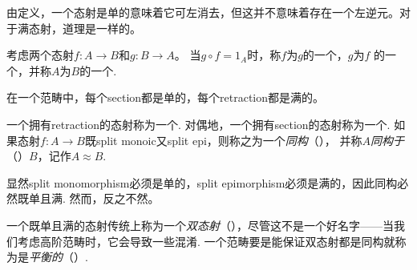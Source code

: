   由定义，一个态射是单的意味着它可左消去，但这并不意味着存在一个左逆元。对于满态射，道理是一样的。
  \begin{defn}
    考虑两个态射$f\colon A \to B$和$g\colon B \to A$。 当$g \circ f = 1_A$时，称$f$为$g$的一个，$g$为$f$ 的一个，并称$A$为$B$的一个.
  \end{defn}
  \begin{prop}
    在一个范畴中，每个section都是单的，每个retraction都是满的。
  \end{prop}
  \begin{defn}
    一个拥有retraction的态射称为一个.
    对偶地，一个拥有section的态射称为一个.
    如果态射$f\colon A\to B$既split monoic又split epi，则称之为一个\emph{同构}（），
    并称$A$\emph{同构于}（）$B$，记作$A\approx B$.  
  \end{defn}
  \begin{rem}
    显然split monomorphism必须是单的，split epimorphism必须是满的，因此同构必然既单且满. 然而，反之不然。

    一个既单且满的态射传统上称为一个\emph{双态射}（），尽管这不是一个好名字——当我们考虑高阶范畴时，它会导致一些混淆. 一个范畴要是能保证双态射都是同构就称为是\emph{平衡的}（）.
  \end{rem}

